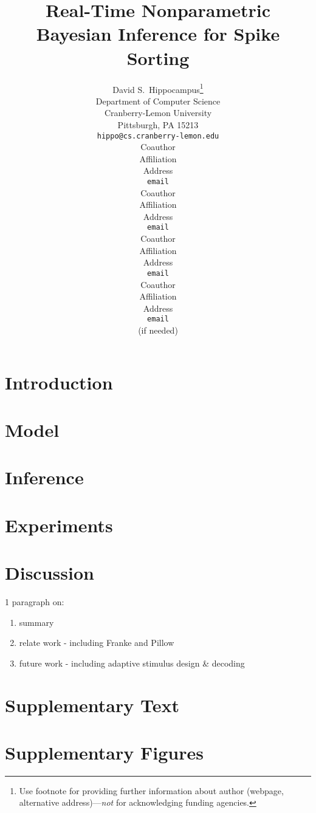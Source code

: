 \documentclass{article} %
\title{Real-Time Nonparametric Bayesian Inference  for  Spike Sorting}
\author{
David S.~Hippocampus\thanks{ Use footnote for providing further information
about author (webpage, alternative address)---\emph{not} for acknowledging
funding agencies.} \\
Department of Computer Science\\
Cranberry-Lemon University\\
Pittsburgh, PA 15213 \\
\texttt{hippo@cs.cranberry-lemon.edu} \\
\And
Coauthor \\
Affiliation \\
Address \\
\texttt{email} \\
\AND
Coauthor \\
Affiliation \\
Address \\
\texttt{email} \\
\And
Coauthor \\
Affiliation \\
Address \\
\texttt{email} \\
\And
Coauthor \\
Affiliation \\
Address \\
\texttt{email} \\
(if needed)\\
}
\begin{document}
\maketitle

\begin{abstract}

\end{abstract}

\section{Introduction}



 
\section{Model}


\section{Inference} \label{sec:inf}



\section{Experiments}


 
\section{Discussion}


1 paragraph on:
\begin{enumerate}
	\item summary
	\item relate work - including Franke and Pillow
	\item future work - including adaptive stimulus design \& decoding
\end{enumerate}


\begin{comment}
\subsubsection*{Acknowledgments}

Use unnumbered third level headings for the acknowledgments. All
acknowledgments go at the end of the paper. Do not include 
acknowledgments in the anonymized submission, only in the 
final paper. 
\end{comment}

{\small


}

\clearpage
\appendix

\section{Supplementary Text}


\section{Supplementary Figures}

\end{document}
